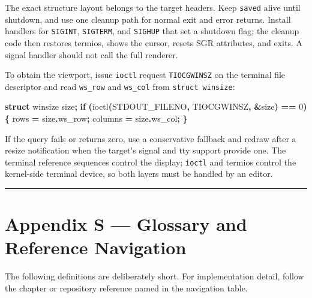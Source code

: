 \documentclass[
  oneside,
  openany]{book}
\newenvironment{Shaded}{\begin{snugshade}}{\end{snugshade}}
\newcommand{\ControlFlowTok}[1]{\textcolor[rgb]{0.13,0.29,0.53}{\textbf{#1}}}
\newcommand{\DecValTok}[1]{\textcolor[rgb]{0.00,0.00,0.81}{#1}}
\newcommand{\KeywordTok}[1]{\textcolor[rgb]{0.13,0.29,0.53}{\textbf{#1}}}
\newcommand{\NormalTok}[1]{#1}
\newcommand{\OperatorTok}[1]{\textcolor[rgb]{0.81,0.36,0.00}{\textbf{#1}}}
\begin{document}
The exact structure layout belongs to the target headers. Keep
\texttt{saved} alive until shutdown, and use one cleanup path for normal
exit and error returns. Install handlers for \texttt{SIGINT},
\texttt{SIGTERM}, and \texttt{SIGHUP} that set a shutdown flag; the
cleanup code then restores termios, shows the cursor, resets SGR
attributes, and exits. A signal handler should not call the full
renderer.

To obtain the viewport, issue \texttt{ioctl} request \texttt{TIOCGWINSZ}
on the terminal file descriptor and read \texttt{ws\_row} and
\texttt{ws\_col} from \texttt{struct\ winsize}:

\begin{Shaded}
\begin{Highlighting}[]
\KeywordTok{struct}\NormalTok{ winsize size}\OperatorTok{;}
\ControlFlowTok{if} \OperatorTok{(}\NormalTok{ioctl}\OperatorTok{(}\NormalTok{STDOUT\_FILENO}\OperatorTok{,}\NormalTok{ TIOCGWINSZ}\OperatorTok{,} \OperatorTok{\&}\NormalTok{size}\OperatorTok{)} \OperatorTok{==} \DecValTok{0}\OperatorTok{)} \OperatorTok{\{}
\NormalTok{    rows }\OperatorTok{=}\NormalTok{ size}\OperatorTok{.}\NormalTok{ws\_row}\OperatorTok{;}
\NormalTok{    columns }\OperatorTok{=}\NormalTok{ size}\OperatorTok{.}\NormalTok{ws\_col}\OperatorTok{;}
\OperatorTok{\}}
\end{Highlighting}
\end{Shaded}

If the query fails or returns zero, use a conservative fallback and
redraw after a resize notification when the target's signal and tty
support provide one. The terminal reference sequences control the
display; \texttt{ioctl} and termios control the kernel-side terminal
device, so both layers must be handled by an editor.

\begin{center}\rule{0.5\linewidth}{0.5pt}\end{center}

\hypertarget{appendix-s-glossary-and-reference-navigation}{%
\chapter{Appendix S --- Glossary and Reference
Navigation}\label{appendix-s-glossary-and-reference-navigation}}

The following definitions are deliberately short. For implementation
detail, follow the chapter or repository reference named in the
navigation table.
\end{document}
